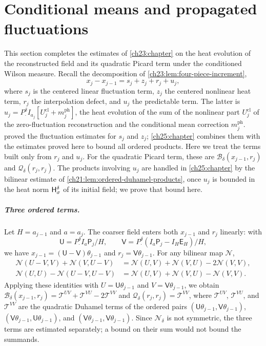 \chapter{Conditional means and propagated fluctuations}\label{ch24:chapter}

This section completes the estimates of \cref{ch23:chapter} on the heat evolution of the reconstructed field and its quadratic Picard term under the conditioned Wilson measure. Recall the decomposition of \cref{ch23:lem:four-piece-increment},
\[
 x_j-x_{j-1}=s_j+z_j+r_j+u_j,
\]
where $s_j$ is the centered linear fluctuation term, $z_j$ the centered nonlinear heat term, $r_j$ the interpolation defect, and $u_j$ the predictable term. The latter is $u_j=P_\cdot^\delta I_{a_j}[U_j^{\mathrm{cl}}+m_j^{\mathrm{ph}}]$, the heat evolution of the sum of the nonlinear part $U_j^{\mathrm{cl}}$ of the zero-fluctuation reconstruction and the conditional mean correction $m_j^{\mathrm{ph}}$.  proved the fluctuation estimates for $s_j$ and $z_j$; \cref{ch25:chapter} combines them with the estimates proved here to bound all ordered products. Here we treat the terms built only from $r_j$ and $u_j$. For the quadratic Picard term, these are $\mathcal B_\delta(x_{j-1},r_j)$ and $\mathcal Q_\delta(r_j,r_j)$. The products involving $u_j$ are handled in \cref{ch25:chapter} by the bilinear estimate of \cref{ch21:lem:ordered-duhamel-products}, once $u_j$ is bounded in the heat norm $\mathsf H_{\sigma}^{\delta}$ of its initial field; we prove that bound here.

\paragraph{Three ordered terms.}
Let $H=a_{j-1}$ and $a=a_j$. The coarser field enters both $x_{j-1}$ and $r_j$ linearly: with
\[
 \mathsf U=P_\cdot^\delta I_a\mathsf P_j/H,\qquad \mathsf V=P_\cdot^\delta(I_a\mathsf P_j-I_H\mathsf E_H)/H,
\]
we have $x_{j-1}=(\mathsf U-\mathsf V)\theta_{j-1}$ and $r_j=\mathsf V\theta_{j-1}$. For any bilinear map $\mathcal N$,
\begin{align*}
 \mathcal N(U-V,V)+\mathcal N(V,U-V)&=\mathcal N(U,V)+\mathcal N(V,U)-2\mathcal N(V,V),\\
 \mathcal N(U,U)-\mathcal N(U-V,U-V)&=\mathcal N(U,V)+\mathcal N(V,U)-\mathcal N(V,V).
\end{align*}
Applying these identities with $U=\mathsf U\theta_{j-1}$ and $V=\mathsf V\theta_{j-1}$, we obtain $\mathcal B_\delta(x_{j-1},r_j)=\mathscr T^{UV}+\mathscr T^{VU}-2\mathscr T^{VV}$ and $\mathcal Q_\delta(r_j,r_j)=\mathscr T^{VV}$, where $\mathscr T^{UV}$, $\mathscr T^{VU}$, and $\mathscr T^{VV}$ are the quadratic Duhamel terms of the ordered pairs $(\mathsf U\theta_{j-1},\mathsf V\theta_{j-1})$, $(\mathsf V\theta_{j-1},\mathsf U\theta_{j-1})$, and $(\mathsf V\theta_{j-1},\mathsf V\theta_{j-1})$. Since $\mathcal N_\delta$ is not symmetric, the three terms are estimated separately; a bound on their sum would not bound the summands.

